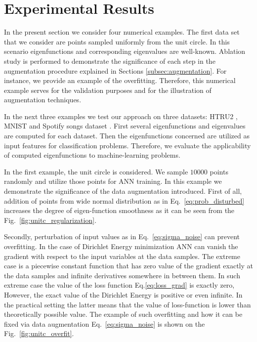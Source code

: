 \documentclass{article}
\theoremstyle{plain}
\theoremstyle{definition}
\theoremstyle{remark}
\begin{document}
\section{Experimental Results}
\label{sec:experimental_results}

In the present section we consider four numerical examples.
The first data set that we consider are points sampled uniformly from the unit circle.
In this scenario eigenfunctions and corresponding eigenvalues are well-known.
Ablation study is performed to demonstrate the significance of each step in the augmentation procedure explained in
Sections \ref{subsec:augmentation}. For instance, we provide an example of the overfitting.
Therefore, this numerical example serves for the validation purposes and for the illustration of augmentation techniques.

In the next three examples we test our approach on three datasets: HTRU2 \cite{10.1093/mnras/stw656, Lyon2016},
MNIST \cite{lecun-mnisthandwrittendigit-2010} and Spotify songs dataset \cite{spotify_dataset}.
First several eigenfunctions and eigenvalues are computed for each dataset.
Then the eigenfunctions concerned are utilized as input features for classification problems.
Therefore, we evaluate the applicability of computed eigenfunctions to machine-learning problems.


In the first example, the unit circle is considered. We sample $10000$ points randomly and utilize those points
for ANN training. In this example we demonstrate the significance of the data augmentation introduced.
First of all, addition of points from wide normal distribution as in Eq.~\eqref{eq:prob_disturbed}
increases the degree of eigen-function smoothness as it can be seen from the Fig.~\ref{fig:unitc_regularization}.


Secondly, perturbation of input values as in Eq.~\eqref{eq:sigma_noise} can prevent overfitting.
In the case of Dirichlet Energy minimization ANN can vanish the gradient with respect to the input variables
at the data samples. The extreme case is a piecewise constant function that has zero value of the gradient
exactly at the data samples and infinite derivatives somewhere in between them.
In such extreme case the value of the loss function Eq.\eqref{eq:loss_grad} is exactly zero,
However, the exact value of the Dirichlet Energy is positive or even infinite.
In the practical setting the latter means that the value of loss-function is lower than theoretically possible value.
The example of such overfitting and how it can be fixed via data augmentation Eq.~\eqref{eq:sigma_noise}
is shown on the Fig.~\ref{fig:unitc_overfit}.
\end{document}
